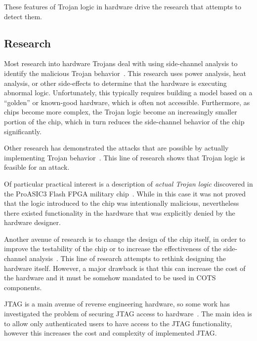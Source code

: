 \documentclass[11pt,letterpaper]{article}
\begin{document}
These features of Trojan logic in hardware drive the research that
attempts to detect them. 

\subsection{Research}

Most research into hardware Trojans deal with using side-channel
analysis to identify the malicious Trojan behavior~\cite{Lee2005,
  Agrawal2007, Banga2008, Banga2008a, Jin2008, Du2010, Narasimhan2011,
  Narasimhan2012, Cao2013, Davoodi2013, Dworak2013, Forte2013,
  Liu2013, Liu2014, Bao2015}. This research uses power analysis, heat
analysis, or other side-effects to determine that the hardware is
executing abnormal logic. Unfortunately, this typically requires
building a model based on a ``golden'' or known-good hardware, which
is often not accessible. Furthermore, as chips become more complex,
the Trojan logic become an increasingly smaller portion of the chip,
which in turn reduces the side-channel behavior of the chip
significantly. 

Other research has demonstrated the attacks that are possible by
actually implementing Trojan behavior~\cite{King2008, Jin2010,
  Sturton2011, Liu2013, Jin2014, Zhang2014}. This line of research
shows that Trojan logic is feasible for an attack.

Of particular practical interest is a description of \emph{actual
  Trojan logic} discovered in the ProASIC3 Flash FPGA military
chip~\cite{Skorobogatov2012}. While in this case it was not proved
that the logic introduced to the chip was intentionally malicious,
nevertheless there existed functionality in the hardware that was
explicitly denied by the hardware designer. 

Another avenue of research is to change the design of the chip itself,
in order to improve the testability of the chip or to increase the
effectiveness of the side-channel analysis~\cite{Chakraborty2008,
  Li2008, Salmani2009, Hicks2010, Rosenfeld2011, Waksman2011,
  Bhunia2013, Davoodi2013, Rajendran2013, Rolt2014}. This line of
research attempts to rethink designing the hardware itself. However, a
major drawback is that this can increase the cost of the hardware and
it must be somehow mandated to be used in COTS components. 

JTAG is a main avenue of reverse engineering hardware, so some work
has investigated the problem of securing JTAG access to
hardware~\cite{Rosenfeld2010, Ren2015}. The main idea is to allow only
authenticated users to have access to the JTAG functionality, however
this increases the cost and complexity of implemented JTAG. 
\end{document}
